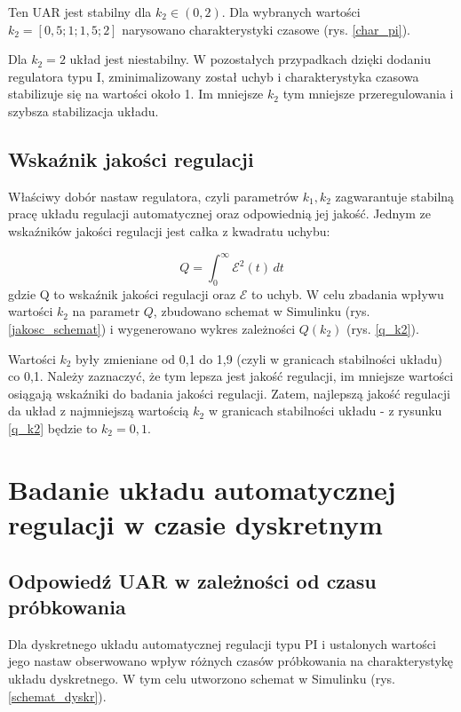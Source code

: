\documentclass[12pt]{article}
\begin{document}

Ten UAR jest stabilny dla $k_2 \in (0,2)$. Dla wybranych wartości $k_2 = [0,5 ; 1 ; 1,5 ; 2]$ narysowano charakterystyki czasowe (rys. \ref{char_pi}).


Dla $k_2 = 2$ układ jest niestabilny. W pozostałych przypadkach dzięki dodaniu regulatora typu I, zminimalizowany został uchyb i charakterystyka czasowa stabilizuje się na wartości około 1. Im mniejsze $k_2$ tym mniejsze przeregulowania i szybsza stabilizacja układu.

\subsection{Wskaźnik jakości regulacji}
Właściwy dobór nastaw regulatora, czyli parametrów $k_1, k_2$ zagwarantuje stabilną pracę układu regulacji automatycznej oraz odpowiednią jej jakość. Jednym ze wskaźników jakości regulacji jest całka z kwadratu uchybu:

\begin{equation}
    Q = \int_{0}^{\infty} \mathcal{E} ^2 (t) \,dt 
\end{equation}
gdzie Q to wskaźnik jakości regulacji oraz $\mathcal{E}$ to uchyb. W celu zbadania wpływu wartości $k_2$ na parametr $Q$, zbudowano schemat w Simulinku (rys. \ref{jakosc_schemat}) i wygenerowano wykres zależności $Q(k_2)$ (rys. \ref{q_k2}).



Wartości $k_2$ były zmieniane od 0,1 do 1,9 (czyli w granicach stabilności układu) co 0,1. Należy zaznaczyć, że tym lepsza jest jakość regulacji, im mniejsze wartości osiągają wskaźniki do badania jakości regulacji. Zatem, najlepszą jakość regulacji da układ z najmniejszą wartością $k_2$ w granicach stabilności układu - z rysunku \ref{q_k2} będzie to $k_2 = 0,1$.

\section{Badanie układu automatycznej regulacji w czasie dyskretnym}
\subsection{Odpowiedź UAR w zależności od czasu próbkowania}
Dla dyskretnego układu automatycznej regulacji typu PI i ustalonych wartości jego nastaw obserwowano wpływ różnych czasów próbkowania na charakterystykę układu dyskretnego. W tym celu utworzono schemat w Simulinku (rys. \ref{schemat_dyskr}). 
\end{document}
